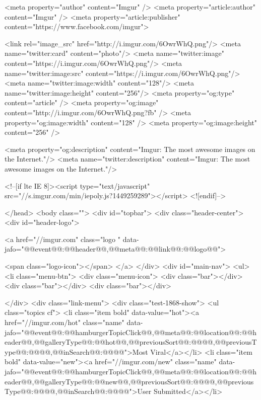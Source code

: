     <meta property="author" content="Imgur" />
    <meta property="article:author" content="Imgur" />
    <meta property="article:publisher" content="https://www.facebook.com/imgur">

    

                        <link rel="image_src"             href="http://i.imgur.com/6OwrWhQ.png"/>
            <meta name="twitter:card"         content="photo"/>
            <meta name="twitter:image"        content="https://i.imgur.com/6OwrWhQ.png"/>
            <meta name="twitter:image:src"    content="https://i.imgur.com/6OwrWhQ.png"/>
            <meta name="twitter:image:width"  content="128"/>
            <meta name="twitter:image:height" content="256"/>
            <meta property="og:type"          content="article" />
            <meta property="og:image"         content="http://i.imgur.com/6OwrWhQ.png?fb" />
            <meta property="og:image:width"   content="128" />
            <meta property="og:image:height"  content="256" />
        
    

            <meta property="og:description" content="Imgur: The most awesome images on the Internet."/>
        <meta name="twitter:description" content="Imgur: The most awesome images on the Internet."/>
    

    
    <!--[if lte IE 8]><script type="text/javascript" src="//s.imgur.com/min/iepoly.js?1449259289"></script>
<![endif]-->
    
        
    
</head>
<body class="">
                        <div id="topbar">
    <div class="header-center">
        <div id="header-logo">

            <a href="//imgur.com" class="logo " data-jafo="{@@event@@:@@header@@,@@meta@@:{@@link@@:@@logo@@}}">
                
                <span class="logo-icon"></span>
            </a>
        </div>
        <div id="main-nav">
            <ul>
                <li class="menu-btn">
                    <div class="menu-icon">
                        <div class="bar"></div>
                        <div class="bar"></div>
                        <div class="bar"></div>
                        
                    </div>
                    <div class="link-menu">
                        <div class="test-1868-show">
                            <ul class="topics cf">
                                <li class="item bold" data-value="hot"><a href="//imgur.com/hot" class="name" data-jafo="{@@event@@:@@hamburgerTopicClick@@,@@meta@@:{@@location@@:@@header@@,@@galleryType@@:@@hot@@,@@previousSort@@:@@@@,@@previousType@@:@@@@,@@inSearch@@:@@@@}}">Most Viral</a></li>
                                <li class="item bold" data-value="new"><a href="//imgur.com/new" class="name" data-jafo="{@@event@@:@@hamburgerTopicClick@@,@@meta@@:{@@location@@:@@header@@,@@galleryType@@:@@new@@,@@previousSort@@:@@@@,@@previousType@@:@@@@,@@inSearch@@:@@@@}}">User Submitted</a></li>
                                

